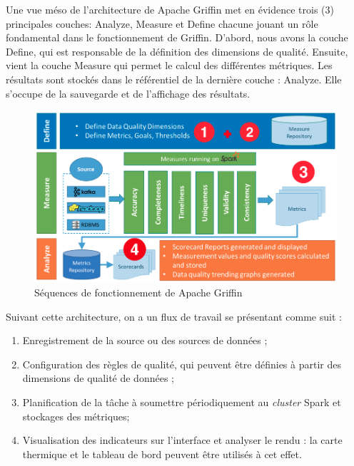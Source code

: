 Une vue m\'eso de l'architecture de Apache Griffin met en \'evidence trois (3) principales couches: Analyze, Measure et Define chacune jouant un r\^ole fondamental dans le fonctionnement de Griffin. D'abord, nous avons la couche Define, qui est responsable de la d\'efinition des dimensions de qualit\'e. Ensuite, vient la couche Measure qui permet le calcul des diff\'erentes m\'etriques. Les r\'esultats sont stock\'es dans le r\'ef\'erentiel de la derni\`ere couche : Analyze. Elle s'occupe de la sauvegarde et de l'affichage des r\'esultats. 

\begin{figure}[!h]
    \caption{S\'equences de fonctionnement de Apache Griffin}  \label{fig:xray}
    \begin{center}
      \includegraphics[scale=0.5]{Main/Static/Sequences_de_fonctionnement_Griffin.png} 
    \end{center}
\end{figure}
Suivant cette architecture, on a un flux de travail se pr\'esentant comme suit :

\begin{enumerate}[parsep=0cm,itemsep=0cm]
\item Enregistrement de la source ou des sources de données ;
\item Configuration des r\`egles de qualit\'e, qui peuvent être définies à partir des dimensions de qualité de données ;
\item Planification  de la tâche à soumettre p\'eriodiquement au \textit{cluster} Spark et stockages des m\'etriques;
\item Visualisation des indicateurs sur l'interface et analyser le rendu : la carte thermique et le tableau de bord peuvent \^etre utilis\'es \`a cet effet.

\end{enumerate}
\vspace{0.2cm} 


